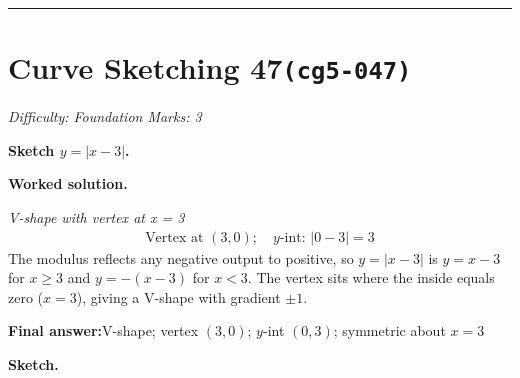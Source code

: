\documentclass[11pt]{article}
\newcommand{\question}[1]{\par\medskip\noindent\textbf{#1}\par}
\begin{document}
\medskip\hrule

\section*{Curve Sketching 47\quad\small\texttt{(cg5-047)}}
\textit{Difficulty: Foundation \quad\textbar\quad Marks: 3}

\question{Sketch \( y = |x - 3| \).}

\textbf{Worked solution.}

\textit{V-shape with vertex at x = 3}
\[\begin{gathered}
\text{Vertex at } (3, 0); \quad y\text{-int: } |0-3| = 3
\end{gathered}\]
The modulus reflects any negative output to positive, so \( y = |x-3| \) is \( y = x - 3 \) for \( x \geq 3 \) and \( y = -(x-3) \) for \( x < 3 \). The vertex sits where the inside equals zero (\( x = 3 \)), giving a V-shape with gradient \( \pm 1 \).

\begin{answerbox}
\textbf{Final answer:}\quad V-shape; vertex \(\displaystyle (3,0)\); \(\displaystyle y\)-int \(\displaystyle (0,3)\); symmetric about \(\displaystyle x = 3\)
\end{answerbox}
\textbf{Sketch.}
\end{document}
